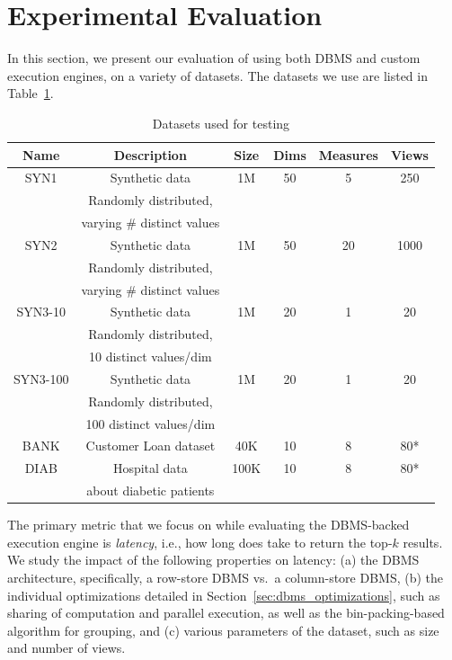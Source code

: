 
\section{Experimental Evaluation}
\label{sec:experiments}
 
In this section, we present our evaluation of
\SeeDB using both DBMS and custom execution engines, 
on a variety of datasets.
The datasets we use are listed 
in Table~\ref{tab:datasets}.

\begin{table}[htb]
  \centering \scriptsize
  \begin{tabular}{|c|c|c|c|c|c|} \hline
  Name & Description & Size & Dims & Measures & Views \\ \hline
  SYN1 & Synthetic data & 1M & 50 & 5 & 250 \\
  & Randomly distributed, & & & & \\ 
  & varying \# distinct values & & & & \\ \hline
  SYN2 & Synthetic data & 1M & 50 & 20 & 1000 \\
  & Randomly distributed, & & & & \\ 
  & varying \# distinct values & & & & \\ \hline
  SYN3-10 & Synthetic data & 1M & 20 & 1 & 20 \\
  & Randomly distributed, & & & & \\ 
  & 10 distinct values/dim & & & & \\ \hline
  SYN3-100 & Synthetic data & 1M & 20 & 1 & 20 \\
  & Randomly distributed, & & & & \\ 
  & 100 distinct values/dim & & & & \\ \hline
  BANK  & Customer Loan dataset  & 40K & 10 & 8 & 80* \\ \hline
  DIAB  & Hospital data & 100K & 10 & 8 & 80* \\
  & about diabetic patients & & & & \\ \hline
  \end{tabular}
  \vspace{-10pt}
  \caption{Datasets used for testing}
  \label{tab:datasets} 
  \vspace{-10pt}
\end{table}



The primary metric that we focus on while evaluating the DBMS-backed
execution engine is {\em latency},
i.e., how long does \SeeDB take to return the top-$k$ results.
We study the impact of the following properties on latency:
(a) the DBMS architecture, specifically, a row-store DBMS vs.~a column-store DBMS,
(b) the individual optimizations detailed in Section~\ref{sec:dbms_optimizations},
such as sharing of computation and parallel execution, as well as 
the bin-packing-based algorithm for grouping, and
(c) various parameters of the dataset, such as size and number of views.

